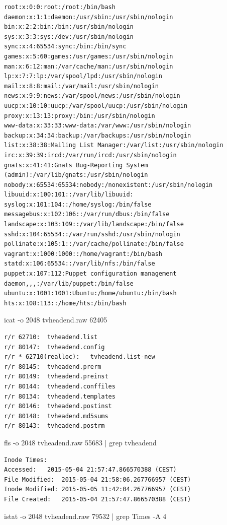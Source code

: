\begin{cmd}[H]
\begin{verbatim}
root:x:0:0:root:/root:/bin/bash
daemon:x:1:1:daemon:/usr/sbin:/usr/sbin/nologin
bin:x:2:2:bin:/bin:/usr/sbin/nologin
sys:x:3:3:sys:/dev:/usr/sbin/nologin
sync:x:4:65534:sync:/bin:/bin/sync
games:x:5:60:games:/usr/games:/usr/sbin/nologin
man:x:6:12:man:/var/cache/man:/usr/sbin/nologin
lp:x:7:7:lp:/var/spool/lpd:/usr/sbin/nologin
mail:x:8:8:mail:/var/mail:/usr/sbin/nologin
news:x:9:9:news:/var/spool/news:/usr/sbin/nologin
uucp:x:10:10:uucp:/var/spool/uucp:/usr/sbin/nologin
proxy:x:13:13:proxy:/bin:/usr/sbin/nologin
www-data:x:33:33:www-data:/var/www:/usr/sbin/nologin
backup:x:34:34:backup:/var/backups:/usr/sbin/nologin
list:x:38:38:Mailing List Manager:/var/list:/usr/sbin/nologin
irc:x:39:39:ircd:/var/run/ircd:/usr/sbin/nologin
gnats:x:41:41:Gnats Bug-Reporting System (admin):/var/lib/gnats:/usr/sbin/nologin
nobody:x:65534:65534:nobody:/nonexistent:/usr/sbin/nologin
libuuid:x:100:101::/var/lib/libuuid:
syslog:x:101:104::/home/syslog:/bin/false
messagebus:x:102:106::/var/run/dbus:/bin/false
landscape:x:103:109::/var/lib/landscape:/bin/false
sshd:x:104:65534::/var/run/sshd:/usr/sbin/nologin
pollinate:x:105:1::/var/cache/pollinate:/bin/false
vagrant:x:1000:1000::/home/vagrant:/bin/bash
statd:x:106:65534::/var/lib/nfs:/bin/false
puppet:x:107:112:Puppet configuration management daemon,,,:/var/lib/puppet:/bin/false
ubuntu:x:1001:1001:Ubuntu:/home/ubuntu:/bin/bash
hts:x:108:113::/home/hts:/bin/bash
\end{verbatim}
\caption{icat -o 2048 tvheadend.raw 62405}
\label{cmd:tvheadend-passwd}
\end{cmd}

\begin{cmd}[H]
\begin{verbatim}
r/r 62710:	tvheadend.list
r/r 80147:	tvheadend.config
r/r * 62710(realloc):	tvheadend.list-new
r/r 80145:	tvheadend.prerm
r/r 80149:	tvheadend.preinst
r/r 80144:	tvheadend.conffiles
r/r 80134:	tvheadend.templates
r/r 80146:	tvheadend.postinst
r/r 80148:	tvheadend.md5sums
r/r 80143:	tvheadend.postrm
\end{verbatim}
\caption{fls -o 2048 tvheadend.raw 55683 | grep tvheadend}
\label{cmd:tvheadend-dpkg}
\end{cmd}

\begin{cmd}[H]
\begin{verbatim}
Inode Times:
Accessed:	2015-05-04 21:57:47.866570388 (CEST)
File Modified:	2015-05-04 21:58:06.267766957 (CEST)
Inode Modified:	2015-05-05 11:42:04.267766957 (CEST)
File Created:	2015-05-04 21:57:47.866570388 (CEST)
\end{verbatim}
\caption{istat -o 2048 tvheadend.raw 79532 | grep Times -A 4}
\label{cmd:tvheadend-rtlhdaccess}
\end{cmd}

